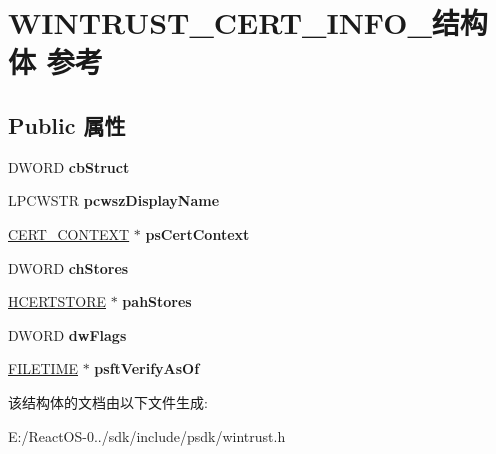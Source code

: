 \hypertarget{struct_w_i_n_t_r_u_s_t___c_e_r_t___i_n_f_o__}{}\section{W\+I\+N\+T\+R\+U\+S\+T\+\_\+\+C\+E\+R\+T\+\_\+\+I\+N\+F\+O\+\_\+结构体 参考}
\label{struct_w_i_n_t_r_u_s_t___c_e_r_t___i_n_f_o__}
\subsection*{Public 属性}
\begin{DoxyCompactItemize}
\item 
\mbox{\label{struct_w_i_n_t_r_u_s_t___c_e_r_t___i_n_f_o___a7893069f90e49bc9cee7fd70c1200b91}} 
D\+W\+O\+RD {\bfseries cb\+Struct}
\item 
\mbox{\label{struct_w_i_n_t_r_u_s_t___c_e_r_t___i_n_f_o___a434a041d327cdb302a4158f19a72f103}} 
L\+P\+C\+W\+S\+TR {\bfseries pcwsz\+Display\+Name}
\item 
\mbox{\label{struct_w_i_n_t_r_u_s_t___c_e_r_t___i_n_f_o___afe28593ff168a9ddd08934a75875a758}} 
\hyperlink{struct___c_e_r_t___c_o_n_t_e_x_t}{C\+E\+R\+T\+\_\+\+C\+O\+N\+T\+E\+XT} $\ast$ {\bfseries ps\+Cert\+Context}
\item 
\mbox{\label{struct_w_i_n_t_r_u_s_t___c_e_r_t___i_n_f_o___a500c86f32c92b34230e8356c0df93419}} 
D\+W\+O\+RD {\bfseries ch\+Stores}
\item 
\mbox{\label{struct_w_i_n_t_r_u_s_t___c_e_r_t___i_n_f_o___a3575fe61a21bf4df68d92effd114b69c}} 
\hyperlink{interfacevoid}{H\+C\+E\+R\+T\+S\+T\+O\+RE} $\ast$ {\bfseries pah\+Stores}
\item 
\mbox{\label{struct_w_i_n_t_r_u_s_t___c_e_r_t___i_n_f_o___ae9d70d7f742e4e150034668f53925f4d}} 
D\+W\+O\+RD {\bfseries dw\+Flags}
\item 
\mbox{\label{struct_w_i_n_t_r_u_s_t___c_e_r_t___i_n_f_o___a2d44b549dbae1b8eeffd369b7c0be704}} 
\hyperlink{struct___f_i_l_e_t_i_m_e}{F\+I\+L\+E\+T\+I\+ME} $\ast$ {\bfseries psft\+Verify\+As\+Of}
\end{DoxyCompactItemize}


该结构体的文档由以下文件生成\+:\begin{DoxyCompactItemize}
\item 
E\+:/\+React\+O\+S-\/0../sdk/include/psdk/wintrust.\+h\end{DoxyCompactItemize}
